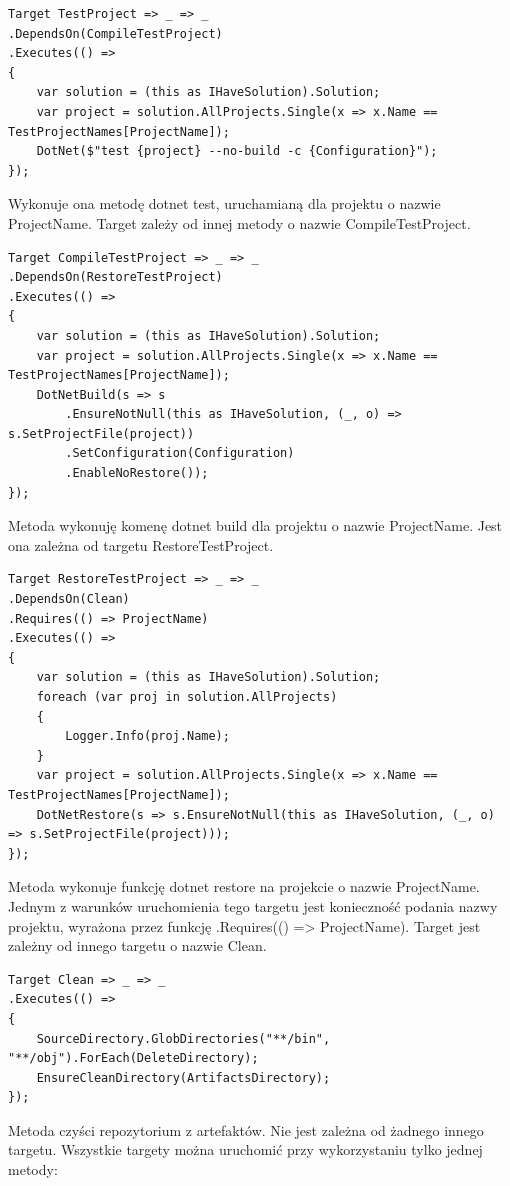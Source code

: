 \documentclass[11pt, a4]{article} %
\begin{document}
\begin{lstlisting}
Target TestProject => _ => _
.DependsOn(CompileTestProject)
.Executes(() =>
{
    var solution = (this as IHaveSolution).Solution;
    var project = solution.AllProjects.Single(x => x.Name == TestProjectNames[ProjectName]);
    DotNet($"test {project} --no-build -c {Configuration}");
});
\end{lstlisting}

Wykonuje ona metodę dotnet test, uruchamianą dla projektu o nazwie ProjectName. 
Target zależy od innej metody o nazwie CompileTestProject.

\begin{lstlisting}
Target CompileTestProject => _ => _
.DependsOn(RestoreTestProject)
.Executes(() =>
{
    var solution = (this as IHaveSolution).Solution;
    var project = solution.AllProjects.Single(x => x.Name == TestProjectNames[ProjectName]);
    DotNetBuild(s => s
        .EnsureNotNull(this as IHaveSolution, (_, o) => s.SetProjectFile(project))
        .SetConfiguration(Configuration)
        .EnableNoRestore());
});
\end{lstlisting}

Metoda wykonuję komenę dotnet build dla projektu o nazwie ProjectName. Jest ona 
zależna od targetu RestoreTestProject.

\begin{lstlisting}
Target RestoreTestProject => _ => _
.DependsOn(Clean)
.Requires(() => ProjectName)
.Executes(() =>
{
    var solution = (this as IHaveSolution).Solution;
    foreach (var proj in solution.AllProjects)
    {
        Logger.Info(proj.Name);
    }
    var project = solution.AllProjects.Single(x => x.Name == TestProjectNames[ProjectName]);
    DotNetRestore(s => s.EnsureNotNull(this as IHaveSolution, (_, o) => s.SetProjectFile(project)));
});
\end{lstlisting}

Metoda wykonuje funkcję dotnet restore na projekcie o nazwie ProjectName. Jednym z 
warunków uruchomienia tego targetu jest konieczność podania nazwy projektu, wyrażona 
przez funkcję .Requires(() => ProjectName). Target jest zależny od innego targetu o 
nazwie Clean.

\begin{lstlisting}
Target Clean => _ => _
.Executes(() =>
{
    SourceDirectory.GlobDirectories("**/bin", "**/obj").ForEach(DeleteDirectory);
    EnsureCleanDirectory(ArtifactsDirectory);
});
\end{lstlisting}

Metoda czyści repozytorium z artefaktów. Nie jest zależna od żadnego innego targetu.
Wszystkie targety można uruchomić przy wykorzystaniu tylko jednej metody:
\end{document}
